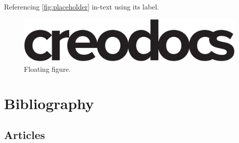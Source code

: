 \documentclass[
	11pt, %
	fleqn, %
	a4paper, %
]{LegrandOrangeBook}
\begin{document}
Referencing \autoref{fig:placeholder} in-text using its label.

\begin{figure}[b] %
	\centering %
	\includegraphics[width=\textwidth]{creodocs_logo.pdf} %
	\caption{Floating figure.}
	\label{fig:floating} %
\end{figure}


\stopcontents[part] %


\chapterimage{} %
\chapterspaceabove{2.5cm} %
\chapterspacebelow{2cm} %


\chapter*{Bibliography}

\section*{Articles}
\end{document}
